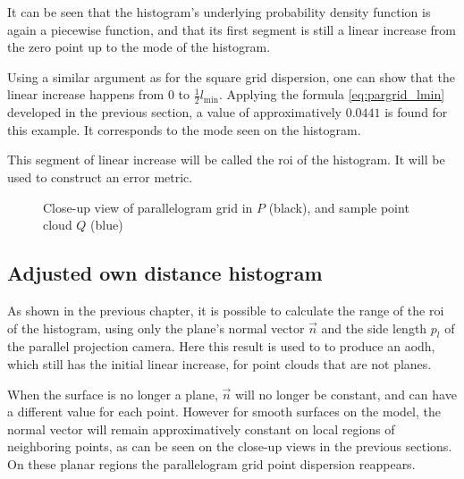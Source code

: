 It can be seen that the histogram's underlying probability density function is again a piecewise function, and that its first segment is still a linear increase from the zero point up to the mode of the histogram.

Using a similar argument as for the square grid dispersion, one can show that the linear increase happens from $0$ to $\frac{1}{2} l_\text{min}$. Applying the formula \ref{eq:pargrid_lmin} developed in the previous section, a value of approximatively $0.0441$ is found for this example. It corresponds to the mode seen on the histogram.

This segment of linear increase will be called the \acrfull{roi} of the histogram. It will be used to construct an error metric.

\begin{figure}[h]
\centering
{
	\setlength{\fboxsep}{0pt}%
	\setlength{\fboxrule}{0.5pt}%
}
\caption{Close-up view of parallelogram grid in $P$ (black), and sample point cloud $Q$ (blue)}
\label{fig:par_grid}
\end{figure}



\subsection{Adjusted own distance histogram}
As shown in the previous chapter, it is possible to calculate the range of the \gls{roi} of the histogram, using only the plane's normal vector $\vec{n}$ and the side length $p_l$ of the parallel projection camera. Here this result is used to to produce an \acrfull{aodh}, which still has the initial linear increase, for point clouds that are not planes.

When the surface is no longer a plane, $\vec{n}$ will no longer be constant, and can have a different value for each point. However for smooth surfaces on the model, the normal vector will remain approximatively constant on local regions of neighboring points, as can be seen on the close-up views in the previous sections. On these planar regions the parallelogram grid point dispersion reappears.

